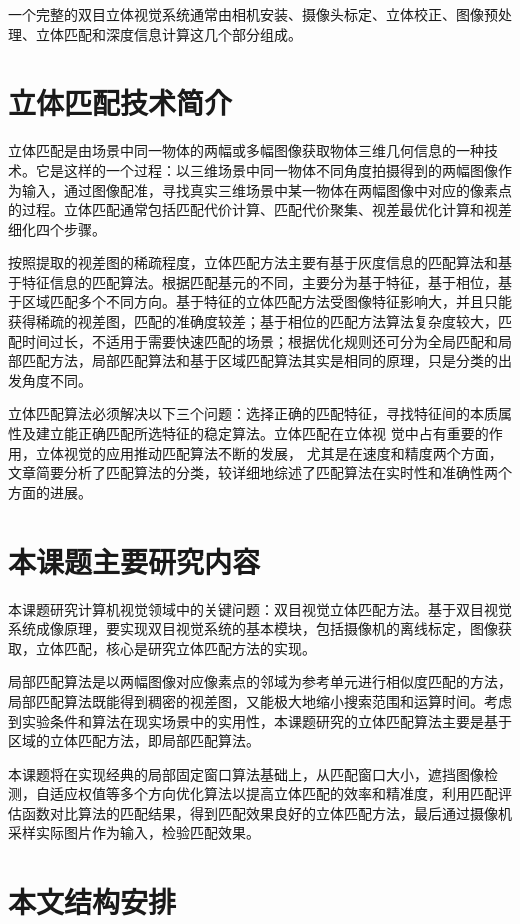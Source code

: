 一个完整的双目立体视觉系统通常由相机安装、摄像头标定、立体校正、图像预处理、立体匹配和深度信息计算这几个部分组成。

\section{立体匹配技术简介}

立体匹配是由场景中同一物体的两幅或多幅图像获取物体三维几何信息的一种技术。它是这样的一个过程：以三维场景中同一物体不同角度拍摄得到的两幅图像作为输入，通过图像配准，寻找真实三维场景中某一物体在两幅图像中对应的像素点的过程。立体匹配通常包括匹配代价计算、匹配代价聚集、视差最优化计算和视差细化四个步骤。

按照提取的视差图的稀疏程度，立体匹配方法主要有基于灰度信息的匹配算法和基于特征信息的匹配算法。根据匹配基元的不同，主要分为基于特征，基于相位，基于区域匹配多个不同方向。基于特征的立体匹配方法受图像特征影响大，并且只能获得稀疏的视差图，匹配的准确度较差；基于相位的匹配方法算法复杂度较大，匹配时间过长，不适用于需要快速匹配的场景；根据优化规则还可分为全局匹配和局部匹配方法，局部匹配算法和基于区域匹配算法其实是相同的原理，只是分类的出发角度不同。

立体匹配算法必须解决以下三个问题：选择正确的匹配特征，寻找特征间的本质属性及建立能正确匹配所选特征的稳定算法。立体匹配在立体视 觉中占有重要的作用，立体视觉的应用推动匹配算法不断的发展， 尤其是在速度和精度两个方面，文章简要分析了匹配算法的分类，较详细地综述了匹配算法在实时性和准确性两个方面的进展。

\section{本课题主要研究内容}

本课题研究计算机视觉领域中的关键问题：双目视觉立体匹配方法。基于双目视觉系统成像原理，要实现双目视觉系统的基本模块，包括摄像机的离线标定，图像获取，立体匹配，核心是研究立体匹配方法的实现。

局部匹配算法是以两幅图像对应像素点的邻域为参考单元进行相似度匹配的方法，局部匹配算法既能得到稠密的视差图，又能极大地缩小搜索范围和运算时间。考虑到实验条件和算法在现实场景中的实用性，本课题研究的立体匹配算法主要是基于区域的立体匹配方法，即局部匹配算法。

本课题将在实现经典的局部固定窗口算法基础上，从匹配窗口大小，遮挡图像检测，自适应权值等多个方向优化算法以提高立体匹配的效率和精准度，利用匹配评估函数对比算法的匹配结果，得到匹配效果良好的立体匹配方法，最后通过摄像机采样实际图片作为输入，检验匹配效果。

\section{本文结构安排}

